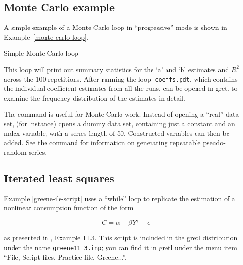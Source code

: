 \subsection{Monte Carlo example}
\label{loop-mc-example}

A simple example of a Monte Carlo loop in ``progressive'' mode is
shown in Example~\ref{monte-carlo-loop}.

\begin{script}[htbp]
  \caption{Simple Monte Carlo loop}
  \label{monte-carlo-loop}
\end{script}

This loop will print out summary statistics for the `a' and `b'
estimates and $R^2$ across the 100 repetitions.  After running the
loop, \verb+coeffs.gdt+, which contains the individual coefficient
estimates from all the runs, can be opened in gretl to examine
the frequency distribution of the estimates in detail.

The command  is useful for Monte Carlo work.  Instead of
opening a ``real'' data set,  (for instance) opens a
dummy data set, containing just a constant and an index variable, with
a series length of 50. Constructed variables can then be added.  See
the  command for information on generating repeatable
pseudo-random series.

\subsection{Iterated least squares}
\label{loop-ils-examples}

Example \ref{greene-ils-script} uses a ``while'' loop to replicate the
estimation of a nonlinear consumption function of the form
	
\[ C = \alpha + \beta Y^{\gamma} + \epsilon \]

as presented in \cite{greene00}, Example 11.3.  This script is included
in the gretl distribution under the name \verb+greene11_3.inp+;
you can find it in gretl under the menu item ``File, Script files,
Practice file, Greene...''.

